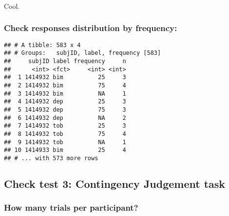 \documentclass[
]{article}
\newenvironment{Shaded}{\begin{snugshade}}{\end{snugshade}}
\newcommand{\KeywordTok}[1]{\textcolor[rgb]{0.13,0.29,0.53}{\textbf{#1}}}
\newcommand{\NormalTok}[1]{#1}
\newcommand{\OperatorTok}[1]{\textcolor[rgb]{0.81,0.36,0.00}{\textbf{#1}}}
\newcommand{\StringTok}[1]{\textcolor[rgb]{0.31,0.60,0.02}{#1}}
\begin{document}
Cool.

\hypertarget{check-responses-distribution-by-frequency}{%
\subsubsection{Check responses distribution by
frequency:}\label{check-responses-distribution-by-frequency}}

\begin{Shaded}
\end{Shaded}

\begin{verbatim}
## # A tibble: 583 x 4
## # Groups:   subjID, label, frequency [583]
##     subjID label frequency     n
##      <int> <fct>     <int> <int>
##  1 1414932 bim          25     3
##  2 1414932 bim          75     4
##  3 1414932 bim          NA     1
##  4 1414932 dep          25     3
##  5 1414932 dep          75     3
##  6 1414932 dep          NA     2
##  7 1414932 tob          25     3
##  8 1414932 tob          75     4
##  9 1414932 tob          NA     1
## 10 1414933 bim          25     4
## # ... with 573 more rows
\end{verbatim}

\hypertarget{check-test-3-contingency-judgement-task}{%
\subsection{Check test 3: Contingency Judgement
task}\label{check-test-3-contingency-judgement-task}}

\begin{Shaded}
\end{Shaded}

\hypertarget{how-many-trials-per-participant-2}{%
\subsubsection{How many trials per
participant?}\label{how-many-trials-per-participant-2}}
\end{document}
